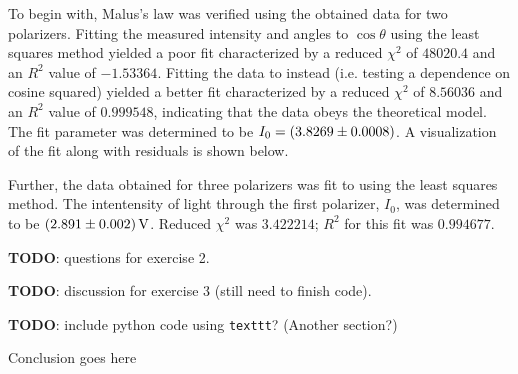 \begin{paper}
	To begin with, Malus's law was verified using the obtained data for two polarizers. Fitting the measured intensity and angles to \( \cos \theta \) using the least squares method yielded a poor fit characterized by a reduced \( \chi ^ 2 \) of \( 48020.4 \) and an \( R^2 \) value of \( -1.53364 \). Fitting the data to \eqMalusLaw instead (i.e. testing a dependence on cosine squared) yielded a better fit characterized by a reduced \( \chi ^ 2 \)	of \( 8.56036 \) and an \( R ^ 2 \) value of \( 0.999548 \), indicating that the data obeys the theoretical model. The fit parameter was determined to be \( I_0 = \left(3.8269 \pm 0.0008\right) \). A visualization of the fit along with residuals is shown below.
	
	Further, the data obtained for three polarizers was fit to \eqThreePolarizers using the least squares method. The intentensity of light through the first polarizer, \( I_0 \), was determined to be \( \left(2.891 \pm 0.002\right) \si{\volt} \). Reduced \( \chi^2 \) was \( 3.422214 \); \( R^2 \) for this fit was \( 0.994677 \).
	
	\textbf{TODO}: questions for exercise 2.
	
	\textbf{TODO}: discussion for exercise 3 (still need to finish code).
	
	\textbf{TODO}: include python code using \texttt{texttt}? (Another section?)
	

	Conclusion goes here
	


\end{paper}

